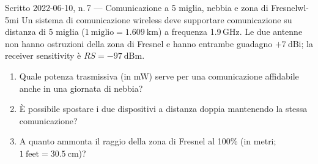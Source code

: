 \documentclass{report}
\begin{document}
\begin{Exercise}{Scritto 2022-06-10, n.\,7 --- Comunicazione a 5 miglia, nebbia e zona di Fresnel}{wl-5mi}
Un sistema di comunicazione wireless deve supportare comunicazione su distanza
di 5 miglia ($1\ \text{miglio}=1.609\ \text{km}$) a frequenza 1.9\,GHz. Le due
antenne non hanno ostruzioni della zona di Fresnel e hanno entrambe guadagno
$+7\ \text{dBi}$; la receiver sensitivity è $RS=-97\ \text{dBm}$.
\begin{enumerate}
  \item Quale potenza trasmissiva (in mW) serve per una comunicazione affidabile
        anche in una giornata di nebbia?
  \item È possibile spostare i due dispositivi a distanza doppia mantenendo la
        stessa comunicazione?
  \item A quanto ammonta il raggio della zona di Fresnel al 100\%
        (in metri; $1\ \text{feet}=30.5\ \text{cm}$)?
\end{enumerate}
\end{Exercise}
\end{document}
